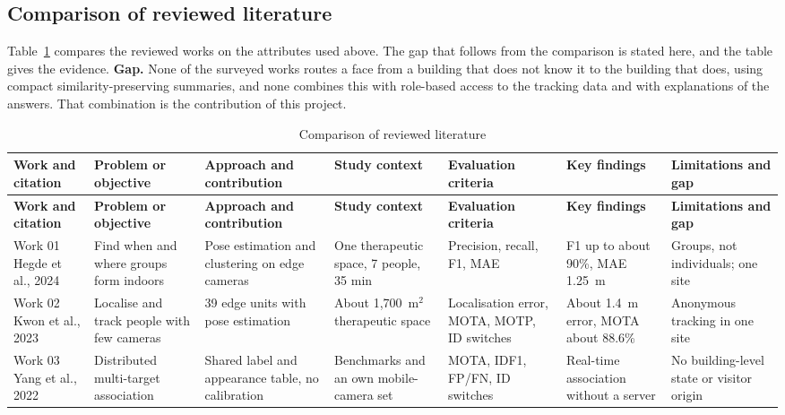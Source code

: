 \documentclass[12pt,a4paper,oneside]{report}
\begin{document}
\clearpage
\begin{landscape}
\section{Comparison of reviewed literature}
Table~\ref{tab:literature} compares the reviewed works on the attributes used above. The gap that follows from the comparison is stated here, and the table gives the evidence. \textbf{Gap.} None of the surveyed works routes a face from a building that does not know it to the building that does, using compact similarity-preserving summaries, and none combines this with role-based access to the tracking data and with explanations of the answers. That combination is the contribution of this project.

\begingroup\small\setlength{\tabcolsep}{4pt}\renewcommand{\arraystretch}{1.25}
\begin{longtable}{|p{2.2cm}|p{2.6cm}|p{3.5cm}|p{2.7cm}|p{3.0cm}|p{2.9cm}|p{3.3cm}|}
\caption{Comparison of reviewed literature}\label{tab:literature}\\\hline
\textbf{Work and citation} & \textbf{Problem or objective} & \textbf{Approach and contribution} & \textbf{Study context} & \textbf{Evaluation criteria} & \textbf{Key findings} & \textbf{Limitations and gap}\\\hline\endfirsthead
\hline\textbf{Work and citation} & \textbf{Problem or objective} & \textbf{Approach and contribution} & \textbf{Study context} & \textbf{Evaluation criteria} & \textbf{Key findings} & \textbf{Limitations and gap}\\\hline\endhead
Work 01 \cite{ref1} Hegde et al., 2024 & Find when and where groups form indoors & Pose estimation and clustering on edge cameras & One therapeutic space, 7 people, 35 min & Precision, recall, F1, MAE & F1 up to about 90\%, MAE 1.25~m & Groups, not individuals; one site\\\hline
Work 02 \cite{ref2} Kwon et al., 2023 & Localise and track people with few cameras & 39 edge units with pose estimation & About 1,700~m$^2$ therapeutic space & Localisation error, MOTA, MOTP, ID switches & About 1.4~m error, MOTA about 88.6\% & Anonymous tracking in one site\\\hline
Work 03 \cite{ref3} Yang et al., 2022 & Distributed multi-target association & Shared label and appearance table, no calibration & Benchmarks and an own mobile-camera set & MOTA, IDF1, FP/FN, ID switches & Real-time association without a server & No building-level state or visitor origin\\\hline

\end{longtable}
\end{landscape}
\end{document}
